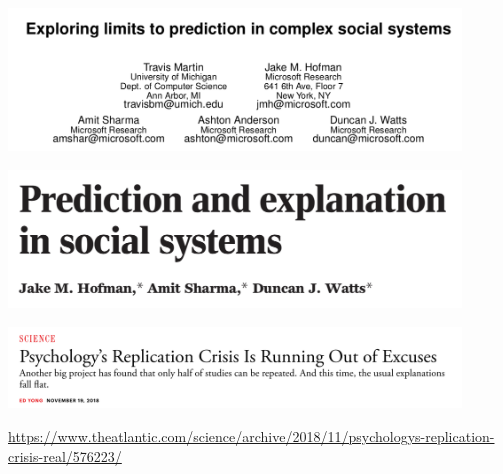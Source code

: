 \documentclass[aspectratio=169]{beamer}
\begin{document}
\begin{frame}

\begin{center}
\includegraphics[width=0.9\textwidth]{figures/martin_exploring_2016_title}
\end{center}

\end{frame}
\begin{frame}

\begin{center}
\includegraphics[width=0.9\textwidth]{figures/hofman_prediction_2017_title}
\end{center}

\end{frame}
\begin{frame}

\begin{center}
\includegraphics[width=0.9\textwidth]{figures/yong_psychologys_2018_title}
\end{center}

\vfill
\url{https://www.theatlantic.com/science/archive/2018/11/psychologys-replication-crisis-real/576223/}

\end{frame}
\end{document}
